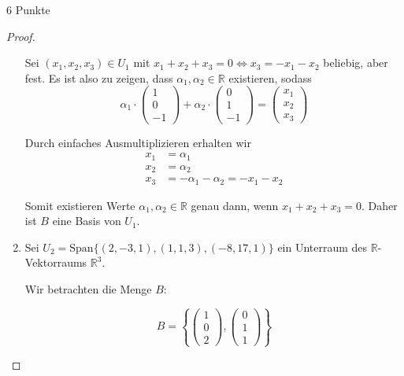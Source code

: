 \documentclass{problemset}
\begin{document}
\begin{problem}{6 Punkte}
\begin{proof}
\begin{enumerate}
              Sei $(x_1, x_2, x_3) \in U_1$ mit $x_1 + x_2 + x_3 = 0 \Leftrightarrow x_3 = -
                  x_1 - x_2$ beliebig, aber fest. Es ist also zu zeigen, dass $\alpha_1, \alpha_2
                  \in \mathbb{R}$ existieren, sodass
              \[
                  \alpha_1 \cdot \begin{pmatrix}
                      1 \\
                      0 \\
                      -1
                  \end{pmatrix} + \alpha_2 \cdot \begin{pmatrix}
                      0 \\
                      1 \\
                      -1
                  \end{pmatrix} = \begin{pmatrix}
                      x_1 \\
                      x_2 \\
                      x_3
                  \end{pmatrix}
              \]

              Durch einfaches Ausmultiplizieren erhalten wir
              \begin{align*}
                  x_1 & = \alpha_1                                             \\
                  x_2 & = \alpha_2                                             \\
                  x_3 & = - \alpha_1 - \alpha_2 = - x_1 - x_2 \tag{\checkmark}
              \end{align*}

              Somit existieren Werte $\alpha_1, \alpha_2 \in \mathbb{R}$ genau dann, wenn
              $x_1 + x_2 + x_3 = 0$. Daher ist $B$ eine Basis von $U_1$.
        \item Sei $U_2 = \text{Span}\{(2, -3, 1), (1, 1, 3), (-8, 17, 1)\}$ ein Unterraum des
              $\mathbb{R}$-Vektorraums $\mathbb{R}^3$.

              Wir betrachten die Menge $B$:

              \[
                  B = \left\{
                  \begin{pmatrix}
                      1 \\ 0 \\ 2
                  \end{pmatrix},
                  \begin{pmatrix}
                      0 \\ 1 \\ 1
                  \end{pmatrix}
                  \right\}
              \]


\end{enumerate}
\end{proof}
\end{problem}
\end{document}
